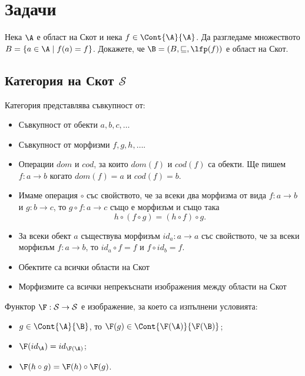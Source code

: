 \newpage

\section{Задачи}

\begin{problem}
  Нека $\A$ е област на Скот и нека $f \in \Cont{\A}{\A}$.
  Да разгледаме множеството $B = \{a \in \A \mid f(a) = f\}$.
  Докажете, че $\B = (B, \sqsubseteq, \lfp(f))$ е област на Скот.
\end{problem}




\subsection{Категория на Скот $\mathcal{S}$}


Категория представлява съвкупност от:
\begin{itemize}
\item
  Съвкупност от обекти $a,b,c,\dots$
\item
  Съвкупност от морфизми $f,g,h,\dots$.
\item
  Операции $dom$ и $cod$, за които
  $dom(f)$ и $cod(f)$ са обекти.
  Ще пишем $f:a\to b$ когато $dom(f) = a$ и $cod(f) = b$.
\item
  Имаме операция $\circ$ със свойството, че
  за всеки два морфизма от вида $f:a\to b$ и $g : b \to c$, то
  $g \circ f : a \to c$ също е морфизъм и също така
  \[h \circ (f \circ g) = (h \circ f) \circ g.\]
\item
  За всеки обект $a$ съществува морфизъм $id_a:a\to a$ със свойството, че
  за всеки морфизъм $f:a\to b$, то
  $id_a \circ f = f$ и $f \circ id_b = f$.
\end{itemize}


\begin{itemize}
\item 
  Обектите са всички области на Скот
\item
  Морфизмите са всички непрекъснати изображения между области на Скот
\end{itemize}


Функтор $\F : \mathcal{S} \to \mathcal{S}$ е изображение, за което са изпълнени условията:
\begin{itemize}
\item
  $g \in \Cont{\A}{\B}$, то $\F(g) \in \Cont{\F(\A)}{\F(\B)}$;
\item
  $\F(id_\A) = id_{\F(\A)}$;
\item
  $\F(h\circ g) = \F(h) \circ \F(g)$.
\end{itemize}



